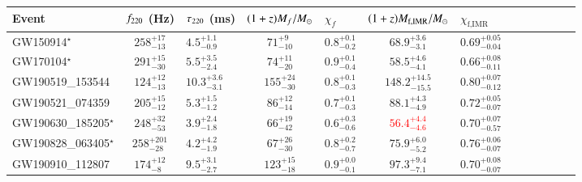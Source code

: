 \begin{tabular}{lclclclclclcl}
\toprule
Event & $f_{\text{220}}$ (Hz) & $\tau_{\text{220}}$ (ms) & $(1+z)M_f/M_{\odot}$ & $\chi_f$ & $(1+z)M_{\text{f,IMR}}/M_{\odot}$ & $\chi_{\text{f,IMR}}$\\[0.075cm]
\midrule
\hline

GW150914$^\star$ &
$258^{+17}_{-13}$ &
$4.5^{+1.1}_{-0.9}$ &
$71^{+9}_{-10}$ &
$0.8^{+0.1}_{-0.2}$ &
$68.9^{+3.6}_{-3.1}$ &
$0.69^{+0.05}_{-0.04}$
\\[0.075cm]

GW170104$^\star$ &
$291^{+15}_{-30}$ &
$5.5^{+3.5}_{-2.4}$ &
$74^{+11}_{-20}$ &
$0.9^{+0.1}_{-0.4}$&
$58.5^{+4.6}_{-4.1}$ &
$0.66^{+0.08}_{-0.11}$
\\[0.075cm]

GW190519\_153544 &
$124^{+12}_{-13}$ &
$10.3^{+3.6}_{-3.1}$ &
$155^{+24}_{-30}$ &
$0.8^{+0.1}_{-0.3}$&
$148.2^{+14.5}_{-15.5}$ &
$0.80^{+0.07}_{-0.12}$
\\[0.075cm]

GW190521\_074359 &
$205^{+15}_{-12}$ &
$5.3^{+1.5}_{-1.2}$ &
$86^{+12}_{-14}$ &
$0.7^{+0.1}_{-0.3}$&
$88.1^{+4.3}_{-4.9}$ &
$0.72^{+0.05}_{-0.07}$
\\[0.075cm]

GW190630\_185205$^\star$ &
$248^{+32}_{-53}$ &
$3.9^{+2.4}_{-1.8}$ &
$66^{+19}_{-42}$ &
$0.6^{+0.3}_{-0.6}$&
\textcolor{red}{$56.4^{+4.4}_{-4.6}$} &
$0.70^{+0.07}_{-0.57}$
\\[0.075cm]

GW190828\_063405$^\star$ &
$258^{+201}_{-28}$ &
$4.2^{+4.2}_{-1.9}$ &
$67^{+26}_{-30}$ &
$0.8^{+0.2}_{-0.7}$&
$75.9^{+6.0}_{-5.2}$ &
$0.76^{+0.06}_{-0.07}$
\\[0.075cm]

GW190910\_112807 &
$174^{+12}_{-8}$ &
$9.5^{+3.1}_{-2.7}$ &
$123^{+15}_{-18}$ &
$0.9^{+0.0}_{-0.1}$&
$97.3^{+9.4}_{-7.1}$ &
$0.70^{+0.08}_{-0.07}$
\\[0.075cm]

\bottomrule
\end{tabular}